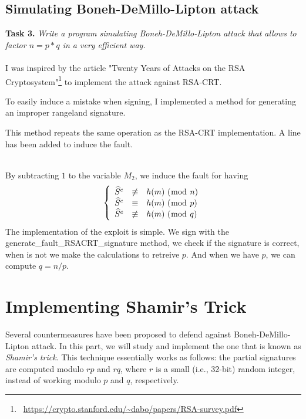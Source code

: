 \documentclass[a4paper]{report}
\begin{document}
\section{Simulating Boneh-DeMillo-Lipton attack}
\textbf{Task 3.} \textit{Write a program simulating Boneh-DeMillo-Lipton attack that allows to factor $n = p*q$ in a very efficient way.}
\\ \\
I was inspired by the article "Twenty Years of Attacks on the RSA Cryptosystem"\footnote{\ \href{https://crypto.stanford.edu/~dabo/papers/RSA-survey.pdf}{\url{https://crypto.stanford.edu/~dabo/papers/RSA-survey.pdf}}} to implement the attack against RSA-CRT.

To easily induce a mistake when signing, I implemented a method for generating an improper rangeland signature.


This method repeats the same operation as the RSA-CRT implementation. A line has been added to induce the fault.

\ 
\\
By subtracting $1$ to the variable $M_2$, we induce the fault for having
\[
\left \{
   \begin{array}{r c l}
      \widehat{S}^e  & \not\equiv & h(m)\ (\bmod\ n) \\
      \widehat{S}^e   & \equiv & h(m)\ (\bmod\ p) \\
      \widehat{S}^e & \not\equiv & h(m)\ (\bmod\ q)
   \end{array}
\right .
\]
\newpage
The implementation of the exploit is simple. We sign with the generate\_fault\_RSACRT\_signature method, we check if the signature is correct, when is not we make the calculations to retreive $p$. And when we have $p$, we can compute $q = n / p$.


\chapter{Implementing Shamir’s Trick}
Several countermeasures have been proposed to defend against Boneh-DeMillo-Lipton attack. In this part, we will study and implement the one that is known as \textit{Shamir’s trick}. This technique essentially works as follows: the partial signatures are computed modulo $rp$ and $rq$, where $r$ is a small (i.e., 32-bit) random integer, instead of working modulo $p$ and $q$, respectively.
\end{document}

